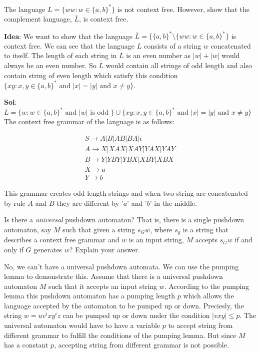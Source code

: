\documentclass[12pt]{exam}
\begin{document}
\begin{questions}
  \question{}
  The language $L=\{ww: w\in \{a,b\}^{*}\}$ is not context free. However, show that the complement language, $\bar{L}$, is context free.

  \begin{solution}

    \textbf{Idea}: We want to show that the language $\bar{L} = \{\{a,b\}^{*}\setminus \{ww: w\in \{a,b\}^{*}\}$ is context free. We can see that the language $L$ consists of a string $w$ concatenated to itself.
    The length of each string in $L$ is an even number as $|w| + |w|$ would always be an even number. So $\bar{L}$ would contain all strings of odd length and also contain string of even length which satisfy this condition $\{xy: x,y\in \{a,b\}^{*} \text{ and } |x|=|y| \text{ and } x\neq y\}$.

    \textbf{Sol}: $\bar{L} = \{w: w\in \{a,b\}^{*} \text{ and } |w| \text{ is odd }\} \cup \{xy: x,y\in \{a,b\}^{*} \text{ and } |x|=|y| \text{ and } x\neq y\}$ The context free grammar of the language is as follows:

    \begin{gather*}
      S\to A|B|AB|BA|\epsilon\\
      A\to X|XAX|XAY|YAX|YAY\\
      B\to Y|YBY|YBX|XBY|XBX\\
      X\to a\\
      Y\to b
    \end{gather*}

    This grammar creates odd length strings and when two string are concatenated by rule $A$ and $B$ they are different by '$a$' and '$b$' in the middle.

  \end{solution}
  \question{}
  Is there a \emph{universal} pushdown automaton? That is, there is a single pushdown automaton, say $M$ such that given a string $s_{G}w$, where $s_{g}$ is a string that describes a context free grammar and $w$ is an input string, $M$ accepts $s_{G}w$ if and only if $G$ generates $w$? Explain your answer.


  \begin{solution}
    No, we can't have a universal pushdown automata. We can use the pumping lemma to demonstrate this. Assume that there is a universal pushdown automaton $M$ such that it accepts an input string $w$. According to the pumping lemma this pushdown automaton has a pumping length $p$ which allows the language accepted by the automaton to be pumped up or down.
    Preciesly, the string $w = uv^{i}xy^{i}z$ can be pumped up or down under the condition $|vxy|\leq p$. The universal automaton would have to have a variable $p$ to accept string from different grammar to fulfill the conditions of the pumping lemma. But since $M$ has a constant $p$, accepting string from different grammar is not possible.
  \end{solution}
\end{questions}
\end{document}
